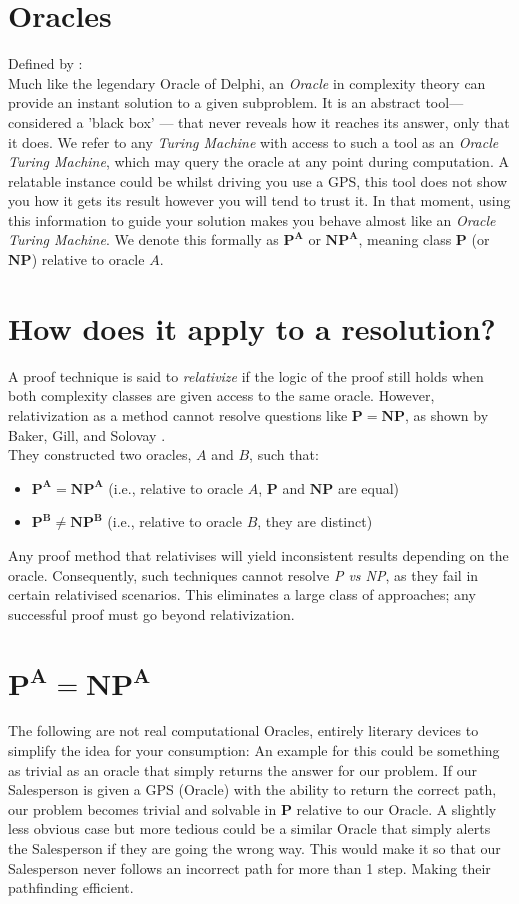 \documentclass[12pt]{report}
\begin{document}
\section{Oracles}
Defined by \cite{arora2009}:\\
Much like the legendary Oracle of Delphi, an \textit{Oracle} in complexity theory can provide an instant solution to a given subproblem.
It is an abstract tool—considered a 'black box' --- that never reveals how it reaches its answer, only that it does.
We refer to any \textit{Turing Machine} with access to such a tool as an \textit{Oracle Turing Machine}, which may query the oracle at any point during computation.
A relatable instance could be whilst driving you use a GPS, this tool does not show you how it gets its result however you will tend to trust it.
In that moment, using this information to guide your solution makes you behave almost like an \textit{Oracle Turing Machine}.
We denote this formally as $\mathbf{P^A}$ or $\mathbf{NP^A}$, meaning class $\mathbf{P}$ (or $\mathbf{NP}$) relative to oracle $A$.

\section{How does it apply to a resolution?}
A proof technique is said to \textit{relativize} if the logic of the proof still holds when both complexity classes are given access to the same oracle.
However, relativization as a method cannot resolve questions like $\mathbf{P = NP}$, as shown by Baker, Gill, and Solovay \cite{baker1975relativizations}.\\
They constructed two oracles, $A$ and $B$, such that:
\begin{itemize}
    \item $\mathbf{P^A = NP^A}$ (i.e., relative to oracle $A$, $\mathbf{P}$ and $\mathbf{NP}$ are equal)
    \item $\mathbf{P^B \neq NP^B}$ (i.e., relative to oracle $B$, they are distinct)
\end{itemize}
Any proof method that relativises will yield inconsistent results depending on the oracle. Consequently, such techniques cannot resolve \textit{P vs NP}, as they fail in certain relativised scenarios. This eliminates a large class of approaches; any successful proof must go beyond relativization.

\section{$\mathbf{P^A = NP^A}$}
The following are not real computational Oracles, entirely literary devices to simplify the idea for your consumption:
An example for this could be something as trivial as an oracle that simply returns the answer for our problem.
If our Salesperson is given a GPS (Oracle) with the ability to return the correct path, our problem becomes trivial and solvable in $\mathbf{P}$ relative to our Oracle.
A slightly less obvious case but more tedious could be a similar Oracle that simply alerts the Salesperson if they are going the wrong way.
This would make it so that our Salesperson never follows an incorrect path for more than 1 step.
Making their pathfinding efficient.
\end{document}
